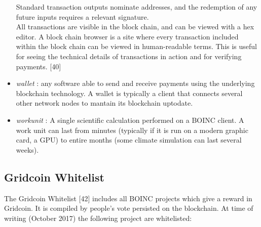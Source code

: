 \begin{itemize}
Standard transaction outputs nominate addresses, and the redemption of any future inputs requires a relevant signature.\\
All transactions are visible in the block chain, and can be viewed with a hex editor. A block chain browser is a site where every transaction included within the block chain can be viewed in human-readable terms. This is useful for seeing the technical details of transactions in action and for verifying payments. [40]
  \item \textit{wallet} : any software able to send and receive payments using the underlying blockchain technology. A wallet is typically a client that connects several other network nodes to mantain its blockchain uptodate.
  \item \textit{workunit} : A single scientific calculation performed on a BOINC client. A work unit can last from minutes (typically if it is run on a modern graphic card, a GPU) 
to entire months (some climate simulation can last several weeks).
\end{itemize}

\subsection{Gridcoin Whitelist}

The Gridcoin Whitelist [42] includes all BOINC projects which give a reward in Gridcoin. It is compiled by people's vote persisted on the blockchain. At time of writing (October 2017) the following project are whitelisted:\\

